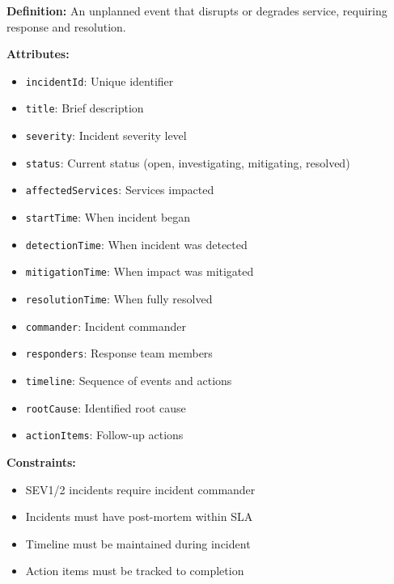 \documentclass[11pt,letterpaper]{article}
\begin{document}
\begin{definitionbox}
\textbf{Definition:} An unplanned event that disrupts or degrades service, requiring response and resolution.

\textbf{Attributes:}
\begin{itemize}[nosep]
    \item \texttt{incidentId}: Unique identifier
    \item \texttt{title}: Brief description
    \item \texttt{severity}: Incident severity level
    \item \texttt{status}: Current status (open, investigating, mitigating, resolved)
    \item \texttt{affectedServices}: Services impacted
    \item \texttt{startTime}: When incident began
    \item \texttt{detectionTime}: When incident was detected
    \item \texttt{mitigationTime}: When impact was mitigated
    \item \texttt{resolutionTime}: When fully resolved
    \item \texttt{commander}: Incident commander
    \item \texttt{responders}: Response team members
    \item \texttt{timeline}: Sequence of events and actions
    \item \texttt{rootCause}: Identified root cause
    \item \texttt{actionItems}: Follow-up actions
\end{itemize}

\textbf{Constraints:}
\begin{itemize}[nosep]
    \item SEV1/2 incidents require incident commander
    \item Incidents must have post-mortem within SLA
    \item Timeline must be maintained during incident
    \item Action items must be tracked to completion
\end{itemize}
\end{definitionbox}
\end{document}
